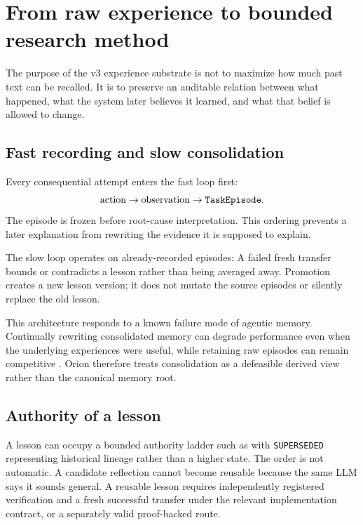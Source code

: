 \section{From raw experience to bounded research method}

The purpose of the v3 experience substrate is not to maximize how much past text can be recalled. It is to preserve an auditable relation between what happened, what the system later believes it learned, and what that belief is allowed to change.

\subsection{Fast recording and slow consolidation}

Every consequential attempt enters the fast loop first:
\[
\text{action}\rightarrow\text{observation}\rightarrow\texttt{TaskEpisode}{}.
\]
The episode is frozen before root-cause interpretation. This ordering prevents a later explanation from rewriting the evidence it is supposed to explain.

The slow loop operates on already-recorded episodes:
A failed fresh transfer bounds or contradicts a lesson rather than being averaged away. Promotion creates a new lesson version; it does not mutate the source episodes or silently replace the old lesson.

This architecture responds to a known failure mode of agentic memory. Continually rewriting consolidated memory can degrade performance even when the underlying experiences were useful, while retaining raw episodes can remain competitive \cite{zhang2026faultymemory}. Orion therefore treats consolidation as a defeasible derived view rather than the canonical memory root.

\subsection{Authority of a lesson}

A lesson can occupy a bounded authority ladder such as
with \texttt{SUPERSEDED} representing historical lineage rather than a higher state. The order is not automatic. A candidate reflection cannot become reusable because the same LLM says it sounds general. A reusable lesson requires independently registered verification and a fresh successful transfer under the relevant implementation contract, or a separately valid proof-backed route.

